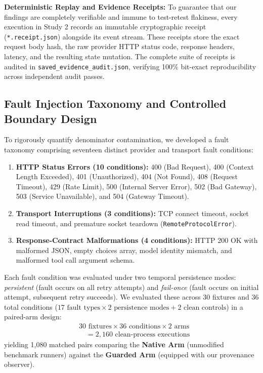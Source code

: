 \textbf{Deterministic Replay and Evidence Receipts:}
To guarantee that our findings are completely verifiable and immune to test-retest flakiness, every execution in Study 2 records an immutable cryptographic receipt (\texttt{*.receipt.json}) alongside its event stream. These receipts store the exact request body hash, the raw provider HTTP status code, response headers, latency, and the resulting state mutation. The complete suite of receipts is audited in \texttt{saved\_evidence\_audit.json}, verifying 100\% bit-exact reproducibility across independent audit passes.

\subsection{Fault Injection Taxonomy and Controlled Boundary Design}

To rigorously quantify denominator contamination, we developed a fault taxonomy comprising seventeen distinct provider and transport fault conditions:
\begin{enumerate}
    \item \textbf{HTTP Status Errors (10 conditions):} 400 (Bad Request), 400 (Context Length Exceeded), 401 (Unauthorized), 404 (Not Found), 408 (Request Timeout), 429 (Rate Limit), 500 (Internal Server Error), 502 (Bad Gateway), 503 (Service Unavailable), and 504 (Gateway Timeout).
    \item \textbf{Transport Interruptions (3 conditions):} TCP connect timeout, socket read timeout, and premature socket teardown (\texttt{RemoteProtocolError}).
    \item \textbf{Response-Contract Malformations (4 conditions):} HTTP 200 OK with malformed JSON, empty choices array, model identity mismatch, and malformed tool call argument schema.
\end{enumerate}

Each fault condition was evaluated under two temporal persistence modes: \textit{persistent} (fault occurs on all retry attempts) and \textit{fail-once} (fault occurs on initial attempt, subsequent retry succeeds). We evaluated these across 30 fixtures and 36 total conditions ($17 \text{ fault types} \times 2 \text{ persistence modes} + 2 \text{ clean controls}$) in a paired-arm design:
\begin{equation}
\begin{aligned}
& 30 \text{ fixtures} \times 36 \text{ conditions} \times 2 \text{ arms} \\
& \quad = 2,160 \text{ clean-process executions}
\end{aligned}
\end{equation}
yielding 1,080 matched pairs comparing the \textbf{Native Arm} (unmodified benchmark runners) against the \textbf{Guarded Arm} (equipped with our provenance observer).

